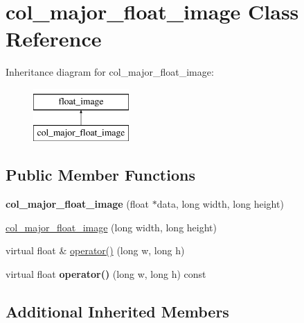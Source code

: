 \hypertarget{classcol__major__float__image}{\section{col\-\_\-major\-\_\-float\-\_\-image Class Reference}
\label{classcol__major__float__image}
}
Inheritance diagram for col\-\_\-major\-\_\-float\-\_\-image\-:\begin{figure}[H]
\begin{center}
\leavevmode
\includegraphics[height=2.000000cm]{classcol__major__float__image}
\end{center}
\end{figure}
\subsection*{Public Member Functions}
\begin{DoxyCompactItemize}
\item 
\hypertarget{classcol__major__float__image_afcf4d9a3059aca06c840338665077b53}{{\bfseries col\-\_\-major\-\_\-float\-\_\-image} (float $\ast$data, long width, long height)}\label{classcol__major__float__image_afcf4d9a3059aca06c840338665077b53}

\item 
\hyperlink{classcol__major__float__image_adeaacc7a78c0e3448597b34bff5b4c62}{col\-\_\-major\-\_\-float\-\_\-image} (long width, long height)
\item 
virtual float \& \hyperlink{classcol__major__float__image_a45315790d78a3d27559946f198129708}{operator()} (long w, long h)
\item 
\hypertarget{classcol__major__float__image_a83784cb35e0fef47a5f4b68fcf5a35c6}{virtual float {\bfseries operator()} (long w, long h) const }\label{classcol__major__float__image_a83784cb35e0fef47a5f4b68fcf5a35c6}

\end{DoxyCompactItemize}
\subsection*{Additional Inherited Members}


